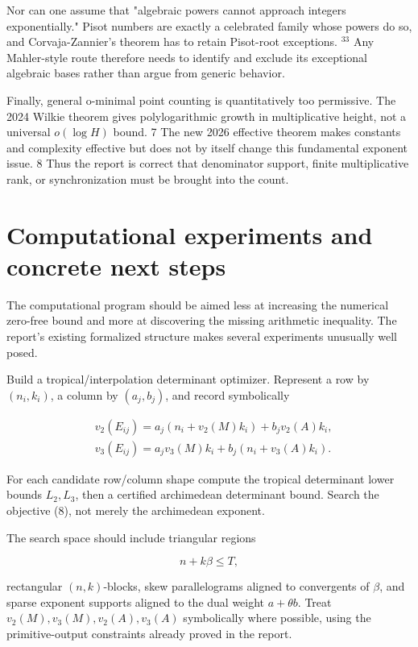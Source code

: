 \documentclass[10pt]{article}
\begin{document}
Nor can one assume that "algebraic powers cannot approach integers exponentially." Pisot numbers are exactly a celebrated family whose powers do so, and Corvaja-Zannier's theorem has to retain Pisot-root exceptions. ${ }^{33}$ Any Mahler-style route therefore needs to identify and exclude its exceptional algebraic bases rather than argue from generic behavior.

Finally, general o-minimal point counting is quantitatively too permissive. The 2024 Wilkie theorem gives polylogarithmic growth in multiplicative height, not a universal $o(\log H)$ bound. 7 The new 2026 effective theorem makes constants and complexity effective but does not by itself change this fundamental exponent issue. 8 Thus the report is correct that denominator support, finite multiplicative rank, or synchronization must be brought into the count.

\section*{Computational experiments and concrete next steps}
The computational program should be aimed less at increasing the numerical zero-free bound and more at discovering the missing arithmetic inequality. The report's existing formalized structure makes several experiments unusually well posed.

Build a tropical/interpolation determinant optimizer. Represent a row by $\left(n_{i}, k_{i}\right)$, a column by $\left(a_{j}, b_{j}\right)$, and record symbolically

$$
\begin{aligned}
& v_{2}\left(E_{i j}\right)=a_{j}\left(n_{i}+v_{2}(M) k_{i}\right)+b_{j} v_{2}(A) k_{i}, \\
& v_{3}\left(E_{i j}\right)=a_{j} v_{3}(M) k_{i}+b_{j}\left(n_{i}+v_{3}(A) k_{i}\right) .
\end{aligned}
$$

For each candidate row/column shape compute the tropical determinant lower bounds $L_{2}, L_{3}$, then a certified archimedean determinant bound. Search the objective (8), not merely the archimedean exponent.

The search space should include triangular regions

$$
n+k \beta \leq T,
$$

rectangular $(n, k)$-blocks, skew parallelograms aligned to convergents of $\beta$, and sparse exponent supports aligned to the dual weight $a+\theta b$. Treat $v_{2}(M), v_{3}(M), v_{2}(A), v_{3}(A)$ symbolically where possible, using the primitive-output constraints already proved in the report.
\end{document}
